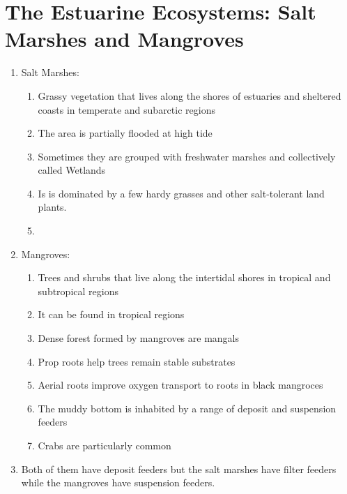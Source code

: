 \documentclass{report}
\begin{document}
\section{The Estuarine Ecosystems: Salt Marshes and Mangroves}
\begin{enumerate}
    \item Salt Marshes:
    \begin{enumerate}
        \item Grassy vegetation that lives along the shores of estuaries and sheltered coasts in temperate and subarctic regions 
        \item The area is partially flooded at high tide
        \item Sometimes they are grouped with freshwater marshes and collectively called Wetlands
        \item Is is dominated by a few hardy grasses and other salt-tolerant land plants.
        \item 
    \end{enumerate}
    \item Mangroves:
    \begin{enumerate}
        \item Trees and shrubs that live along the intertidal shores in tropical and subtropical regions 
        \item It can be found in tropical regions
        \item Dense forest formed by mangroves are mangals
        \item Prop roots help trees remain stable substrates
        \item Aerial roots improve oxygen transport to roots in black mangroces 
        \item The muddy bottom is inhabited by a range of deposit and suspension feeders
        \item Crabs are particularly common 
    \end{enumerate}
    \item Both of them have deposit feeders but the salt marshes have filter feeders while the mangroves have suspension feeders.
\end{enumerate}
\end{document}

